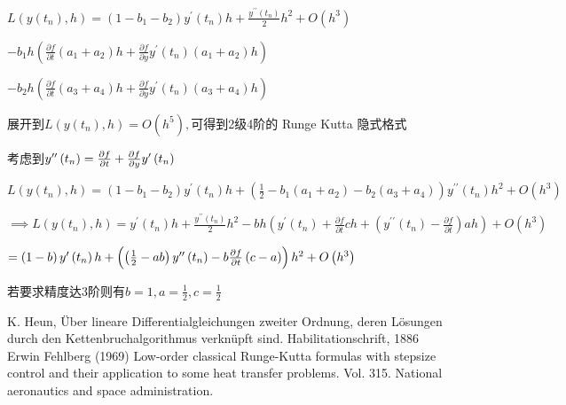 \documentclass{ctexart}
\begin{document}
$L\left( y\left( t_{n}\right) ,h\right) =\left( 1-b_{1}-b_{2}\right)
y^{\prime }\left( t_{n}\right) h+\frac{y^{\prime \prime }\left( t_{n}\right) 
}{2}h^{2}+O\left( h^{3}\right) $

$-b_{1}h\left( \frac{\partial f}{\partial t}\left( a_{1}+a_{2}\right) h+%
\frac{\partial f}{\partial y}y^{\prime }\left( t_{n}\right) \left(
a_{1}+a_{2}\right) h\right) $

\bigskip $-b_{2}h\left( \frac{\partial f}{\partial t}\left(
a_{3}+a_{4}\right) h+\frac{\partial f}{\partial y}y^{\prime }\left(
t_{n}\right) \left( a_{3}+a_{4}\right) h\right) $

\bigskip 展开到$L\left( y\left( t_{n}\right) ,h\right)
=O\left( h^{5}\right) ,$可得到2级4阶的%
Runge Kutta 隐式格式


考虑到$y^{\prime \prime }\left( t_{n}\right) =\frac{%
\partial f}{\partial t}+\frac{\partial f}{\partial y}y^{\prime }\left(
t_{n}\right) $

$L\left( y\left( t_{n}\right) ,h\right) =\left( 1-b_{1}-b_{2}\right)
y^{\prime }\left( t_{n}\right) h+\left( \frac{1}{2}-b_{1}\left(
a_{1}+a_{2}\right) -b_{2}\left( a_{3}+a_{4}\right) \right) y^{\prime \prime
}\left( t_{n}\right) h^{2}+O\left( h^{3}\right) $

$\implies L\left( y\left( t_{n}\right) ,h\right) =y^{\prime }\left(
t_{n}\right) h+\frac{y^{\prime \prime }\left( t_{n}\right) }{2}%
h^{2}-bh\left( y^{\prime }\left( t_{n}\right) +\frac{\partial f}{\partial t}%
ch+\left( y^{\prime \prime }\left( t_{n}\right) -\frac{\partial f}{\partial t%
}\right) ah\right) +O\left( h^{3}\right) $

$=\left( 1-b\right) y^{\prime }\left( t_{n}\right) h+\left( \left( \frac{1}{2%
}-ab\right) y^{\prime \prime }\left( t_{n}\right) -b\frac{\partial f}{%
\partial t}\left( c-a\right) \right) h^{2}+O\left( h^{3}\right) $

若要求精度达3阶则有$%
b=1,a=\frac{1}{2},c=\frac{1}{2}$
\begin{thebibliography}{9}
 K. Heun, Über lineare Differentialgleichungen zweiter Ordnung, deren Lösungen durch den Kettenbruchalgorithmus verknüpft sind. Habilitationschrift, 1886
 Erwin Fehlberg (1969) Low-order classical Runge-Kutta formulas with stepsize control and their application to some heat transfer problems. Vol. 315. National aeronautics and space administration.
\end{thebibliography}
\end{document}

